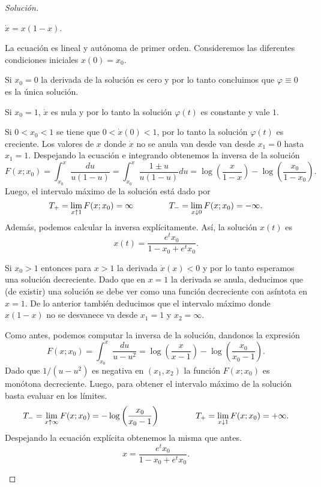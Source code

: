 \begin{proof}[Solución]\ \\
\begin{plist}
\item \(\dot{x} = x(1-x)\).

La ecuación es lineal y autónoma de primer orden.
Consideremos las diferentes condiciones iniciales \(x(0) = x_0\).
\begin{clist}
    \item Si \(x_0 = 0\) la derivada de la solución es cero y por lo tanto
    concluimos que \(\varphi \equiv 0\) es la única solución.

    \item Si \(x_0 = 1\), \(\dot{x}\) es nula y por lo tanto la solución
    \(\varphi(t)\) es constante y vale \(1\).

    \item Si \(0 < x_0 < 1\) se tiene que \(0 < \dot{x}(0) < 1\), por lo tanto la
    solución \(\varphi(t)\) es creciente. Los valores de \(x\) donde \(\dot{x}\)
    no se anula van desde van desde \(x_1 = 0\) hasta \(x_1 = 1\).
    Despejando la ecuación e integrando obtenemos la inversa de la solución
    \[
        F(x;x_0)
        =
        \int_{x_0}^{x} \frac{du}{u\left(1-u\right)}
        =
        \int_{x_0}^{x} \frac{1 \pm u}{u\left(1-u\right)} du
        =
        \log \left(\frac{x}{1-x}\right)
        -
        \log \left(\frac{x_0}{1-x_0}\right)
    .\]
    Luego, el intervalo máximo de la solución está dado por
    \[
        T_{+} = \lim_{x\uparrow 1} F(x;x_0) = \infty
        \hspace{1.5cm}
        T_{-} = \lim_{x\downarrow 0} F(x;x_0) = -\infty
    .\]
    Además, podemos calcular la inversa explícitamente. Así, la solución
    \(x(t)\) es
    \[
        x(t) = \frac{e^{t}x_0}{1 - x_0 + e^{t}x_0}.
    \]

    \item Si \(x_0 > 1\) entonces para \(x > 1\) la derivada \(\dot{x}(x) < 0\) y
    por lo tanto esperamos una solución decreciente. Dado que en \(x = 1\) la
    derivada se anula, deducimos que (de existir) una solución se debe ver como
    una función decreciente con asíntota en \(x = 1\). De lo anterior también
    deducimos que el intervalo máximo donde \(x(1-x)\) no se desvanece va desde
    \(x_1 = 1\) y \(x_2 = \infty\).

    Como antes, podemos computar la inversa de la solución, dandonos la
    expresión
    \[
        F(x;x_0)
        =
        \int_{x_0}^{x} \frac{du}{u-u^2}
        =
        \log\left(\frac{x}{x-1}\right) - \log\left(\frac{x_0}{x_0-1}\right)
    .\]
    Dado que \(1/(u-u^2)\) es negativa en \(\left(x_1,x_2\right)\) la función
    \(F(x;x_0)\) es monótona decreciente. Luego, para obtener el intervalo
    máximo de la solución basta evaluar en los límites.
    \[
        T_{-} = \lim_{x\uparrow \infty} F(x;x_0) = -\log\left(\frac{x_0}{x_0-1}\right)
        \hspace{1.5cm}
        T_{+} = \lim_{x\downarrow 1} F(x;x_0) = +\infty
    .\]
    Despejando la ecuación explícita obtenemos la misma que antes.
    \[
        x = \frac{e^{t}x_0}{1 - x_0 + e^{t}x_0}.
    \]


\end{clist}
\end{plist}
\end{proof}
